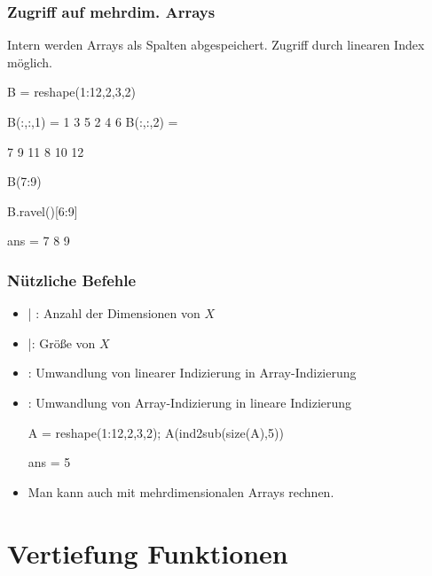 \documentclass[hyperref={xetex}]{beamer}
\begin{document}
%
%
\begin{frame}[fragile]\frametitle{Zugriff auf mehrdim. Arrays}
Intern werden Arrays als Spalten abgespeichert. Zugriff durch linearen
  Index m\"oglich. 
\begin{matlabin}
B = reshape(1:12,2,3,2)
\end{matlabin}
\begin{matlab}
B(:,:,1) =
     1     3     5
     2     4     6
B(:,:,2) =

     7     9    11
     8    10    12
\end{matlab}
\begin{matlabin}
B(7:9)
\end{matlabin}
\begin{pyin}
B.ravel()[6:9]  
\end{pyin}
\begin{matlab}
ans =
     7     8     9
\end{matlab}
\end{frame}
%
% 
\begin{frame}[fragile]\frametitle{N\"utzliche Befehle}
\begin{itemize}
  \item {}| : Anzahl der Dimensionen von $X$ 
  \item {}|: Gr\"o{\ss}e von $X$ 
  \item {}: Umwandlung von linearer Indizierung in Array-Indizierung 
  \item {}: Umwandlung von Array-Indizierung in lineare Indizierung
\begin{matlabin}
A = reshape(1:12,2,3,2);
A(ind2sub(size(A),5))
\end{matlabin}
\begin{matlab}
ans =
     5
\end{matlab}
\item Man kann auch mit mehrdimensionalen Arrays rechnen.
\end{itemize}

\end{frame}
%



\section{Vertiefung Funktionen}
\end{document}
